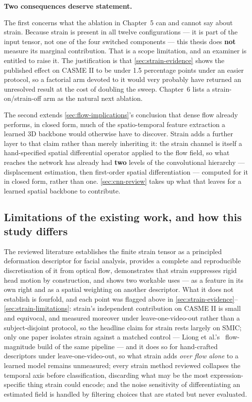 \textbf{Two consequences deserve statement.}

The first concerns what the ablation in Chapter~5 can and cannot say about strain. Because strain is present in all twelve configurations --- it is part of the input tensor, not one of the four switched components --- this thesis does \textbf{not} measure its marginal contribution. That is a scope limitation, and an examiner is entitled to raise it. The justification is that \autoref{sec:strain-evidence} shows the published effect on CASME II to be under 1.5 percentage points under an easier protocol, so a factorial arm devoted to it would very probably have returned an unresolved result at the cost of doubling the sweep. Chapter~6 lists a strain-on/strain-off arm as the natural next ablation.

The second extends \autoref{sec:flow-implications}'s conclusion that dense flow already performs, in closed form, much of the spatio-temporal feature extraction a learned 3D backbone would otherwise have to discover. Strain adds a further layer to that claim rather than merely inheriting it: the strain channel is itself a hand-specified spatial differential operator applied to the flow field, so what reaches the network has already had \textbf{two} levels of the convolutional hierarchy --- displacement estimation, then first-order spatial differentiation --- computed for it in closed form, rather than one. \autoref{sec:cnn-review} takes up what that leaves for a learned spatial backbone to contribute.

\subsection{Limitations of the existing work, and how this study differs}
\label{sec:strain-gap}

The reviewed literature establishes the finite strain tensor as a principled deformation descriptor for facial analysis, provides a complete and reproducible discretisation of it from optical flow, demonstrates that strain suppresses rigid head motion by construction, and shows two workable uses --- as a feature in its own right and as a spatial weighting on another descriptor. What it does not establish is fourfold, and each point was flagged above in \autoref{sec:strain-evidence}--\autoref{sec:strain-limitations}: strain's independent contribution on CASME II is small and equivocal, and measured moreover under leave-one-video-out rather than a subject-disjoint protocol, so the headline claim for strain rests largely on SMIC; only one paper isolates strain against a matched control --- Liong et al.'s~\cite{liong2016} flow-magnitude build of the same pipeline --- and it does so for hand-crafted descriptors under leave-one-video-out, so what strain adds \textit{over flow alone} to a learned model remains unmeasured; every strain method reviewed collapses the temporal axis before classification, discarding what may be the most expression-specific thing strain could encode; and the noise sensitivity of differentiating an estimated field is handled by filtering choices that are stated but never evaluated.

